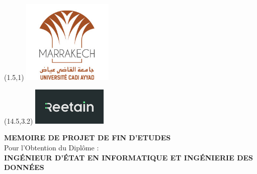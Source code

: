 \documentclass[12pt,a4paper]{report}
\begin{document}
\begin{titlepage}
\begin{center}
    \vspace*{1cm}
    \setlength{\TPHorizModule}{1cm}
    \setlength{\TPVertModule}{1cm}
    
    \begin{textblock}{5}(1.5,1)  %
        \includegraphics[height=4cm]{../images/logos/logo_school.png}
    \end{textblock}
    
    \begin{textblock}{5}(14.5,3.2)  %
        \includegraphics[height=1.8cm]{../images/logos/logo_reetain.png}
    \end{textblock}
    
    \vspace{3.5cm}
    
    
    {\fontsize{20}{24}\selectfont\textbf{\textcolor{coverblue}{MEMOIRE DE PROJET DE FIN D'ETUDES}}}\\[0.3cm]
    
    {\large Pour l'Obtention du Diplôme :}\\[0.3cm]
    
    {\Large\textbf{\textcolor{coverblue}{INGÉNIEUR D'ÉTAT EN INFORMATIQUE ET INGÉNIERIE DES DONNÉES}}}\\[0.8cm]
    

\end{center}
\end{titlepage}
\end{document}
